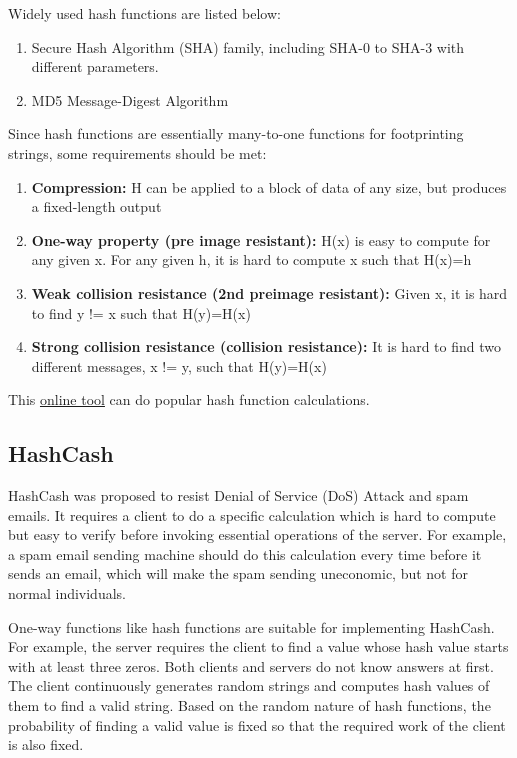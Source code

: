 \documentclass[11pt]{article}
\begin{document}
Widely used hash functions are listed below:

\begin{enumerate}
\item Secure Hash Algorithm (SHA) family, including SHA-0 to SHA-3 with different parameters.
\item MD5 Message-Digest Algorithm
\end{enumerate}

Since hash functions are essentially many-to-one functions for footprinting strings, some requirements should be met: %

\begin{enumerate}
\item \textbf{Compression:}
H can be applied to a block of data of any size, but produces a fixed-length output
\item \textbf{One-way property (pre image resistant):}
H(x) is easy to compute for any given x. For any given h, it is hard to compute x such that H(x)=h
\item \textbf{Weak collision resistance (2nd preimage resistant):}
Given x, it is hard to find y != x such that H(y)=H(x)
\item \textbf{Strong collision resistance (collision resistance):}
It is hard to find two different messages, x != y, such that H(y)=H(x)
\end{enumerate}

This \href{https://www.tools4noobs.com/online_tools/hash}{online tool} can do popular hash function calculations.

\subsection{HashCash}

HashCash was proposed to resist Denial of Service (DoS) Attack and spam emails. It requires a client to do a specific calculation which is hard to compute but easy to verify before invoking essential operations of the server. For example, a spam email sending machine should do this calculation every time before it sends an email, which will make the spam sending uneconomic, but not for normal individuals. 

One-way functions like hash functions are suitable for implementing HashCash. For example, the server requires the client to find a value whose hash value starts with at least three zeros. Both clients and servers do not know answers at first. The client continuously generates random strings and computes hash values of them to find a valid string. Based on the random nature of hash functions, the probability of finding a valid value is fixed so that the required work of the client is also fixed.
\end{document}
